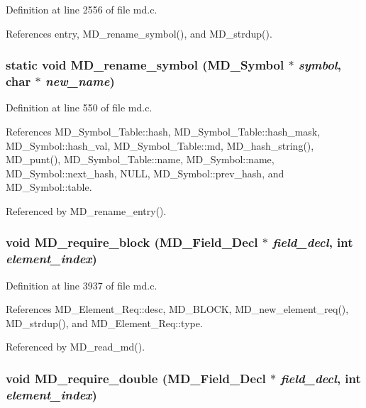 Definition at line 2556 of file md.c.

References entry, MD\_\-rename\_\-symbol(), and MD\_\-strdup().
\subsubsection{\setlength{\rightskip}{0pt plus 5cm}static void MD\_\-rename\_\-symbol (\bf{MD\_\-Symbol} $\ast$ {\em symbol}, char $\ast$ {\em new\_\-name})\hspace{0.3cm}{\tt  [static]}}\label{md_8c_174b21ee5a58de3d2a1788dbd207e7c6}




Definition at line 550 of file md.c.

References MD\_\-Symbol\_\-Table::hash, MD\_\-Symbol\_\-Table::hash\_\-mask, MD\_\-Symbol::hash\_\-val, MD\_\-Symbol\_\-Table::md, MD\_\-hash\_\-string(), MD\_\-punt(), MD\_\-Symbol\_\-Table::name, MD\_\-Symbol::name, MD\_\-Symbol::next\_\-hash, NULL, MD\_\-Symbol::prev\_\-hash, and MD\_\-Symbol::table.

Referenced by MD\_\-rename\_\-entry().
\subsubsection{\setlength{\rightskip}{0pt plus 5cm}void MD\_\-require\_\-block (\bf{MD\_\-Field\_\-Decl} $\ast$ {\em field\_\-decl}, int {\em element\_\-index})}\label{md_8c_0d7c1b6c82b809db593340365c706367}




Definition at line 3937 of file md.c.

References MD\_\-Element\_\-Req::desc, MD\_\-BLOCK, MD\_\-new\_\-element\_\-req(), MD\_\-strdup(), and MD\_\-Element\_\-Req::type.

Referenced by MD\_\-read\_\-md().
\subsubsection{\setlength{\rightskip}{0pt plus 5cm}void MD\_\-require\_\-double (\bf{MD\_\-Field\_\-Decl} $\ast$ {\em field\_\-decl}, int {\em element\_\-index})}\label{md_8c_8138319398084eee4e558c2e19824d9f}




